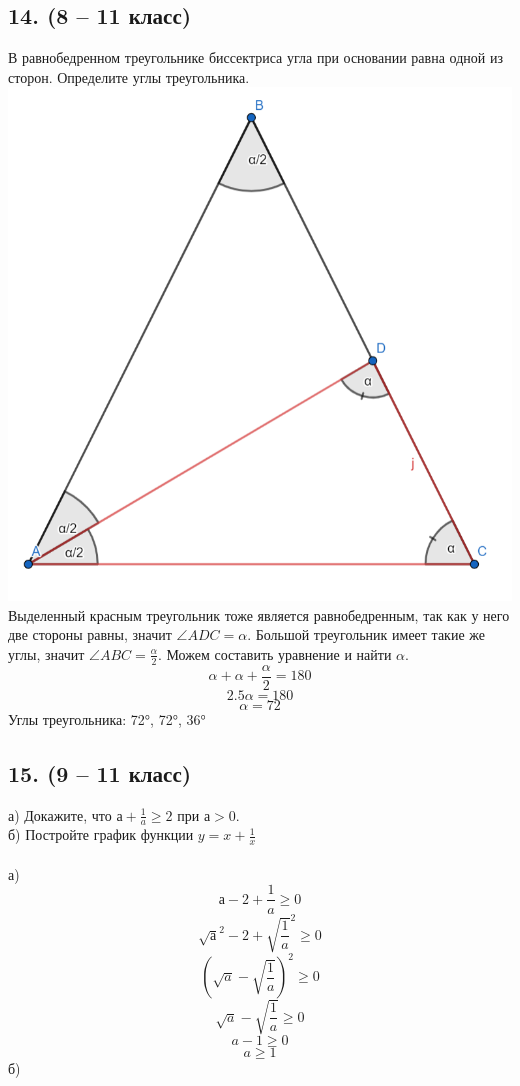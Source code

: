 \documentclass[a4paper,12pt]{article} %
\begin{document}
	\subsection*{14. (8 – 11 класс)}{В равнобедренном треугольнике биссектриса угла при основании равна одной из сторон. Определите углы треугольника.\\
	\includegraphics[scale=0.5]{"Triangle Task 14"}\\
	Выделенный красным треугольник тоже является равнобедренным, так как у него две стороны равны, значит $\angle ADC = \alpha$. Большой треугольник имеет такие же углы, значит $\angle ABC = \frac{\alpha}{2}$. Можем составить уравнение и найти $\alpha$.\\
	$$\alpha + \alpha + \frac{\alpha}{2} = 180$$
	$$2.5\alpha = 180$$
	$$\alpha = 72$$
	Углы треугольника: 72°, 72°, 36°
}
	\subsection*{15. (9 – 11 класс)}{а) Докажите, что $а + \frac{1}{a} \geq 2$ при $а>0$.\\б) Постройте график функции $y = x + \frac{1}{x}$\\\\
		а) $$а -2 + \frac{1}{a} \geq 0$$
		$$\sqrt{а}^2 -2 + \sqrt{\frac{1}{a}}^2 \geq 0$$
		$$(\sqrt{a} - \sqrt{\frac{1}{a}})^2 \geq 0$$
		$$\sqrt{a} - \sqrt{\frac{1}{a}} \geq 0$$
		$$a - 1 \geq 0$$
		$$a \geq 1$$
		б) \\
	}
\end{document}
